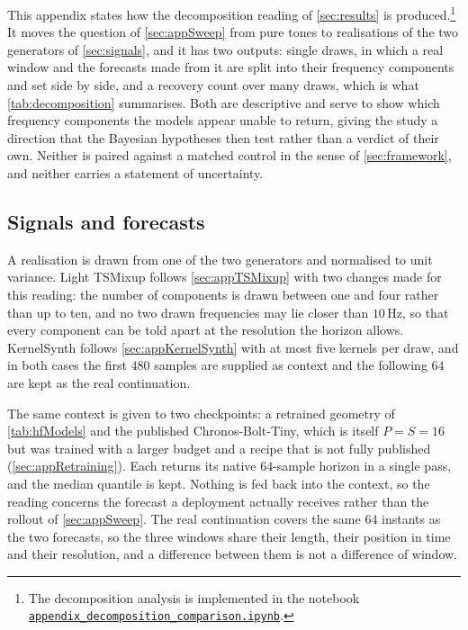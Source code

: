 This appendix states how the decomposition reading of \autoref{sec:results} is produced.\footnote{The decomposition analysis is implemented in the notebook \href{https://github.com/FedericoSabbadini/patchAliasing/blob/main/notebooks/signal_analysis/appendix_decomposition_comparison.ipynb}{\texttt{appendix\_decomposition\_comparison.ipynb}}.} It moves the question of \autoref{sec:appSweep} from pure tones to realisations of the two generators of \autoref{sec:signals}, and it has two outputs: single draws, in which a real window and the forecasts made from it are split into their frequency components and set side by side, and a recovery count over many draws, which is what \autoref{tab:decomposition} summarises. Both are descriptive and serve to show which frequency components the models appear unable to return, giving the study a direction that the Bayesian hypotheses then test rather than a verdict of their own. Neither is paired against a matched control in the sense of \autoref{sec:framework}, and neither carries a statement of uncertainty.

\subsection{Signals and forecasts}

A realisation is drawn from one of the two generators and normalised to unit variance. Light TSMixup follows \autoref{sec:appTSMixup} with two changes made for this reading: the number of components is drawn between one and four rather than up to ten, and no two drawn frequencies may lie closer than $10$\,Hz, so that every component can be told apart at the resolution the horizon allows. KernelSynth follows \autoref{sec:appKernelSynth} with at most five kernels per draw, and in both cases the first $480$ samples are supplied as context and the following $64$ are kept as the real continuation.

The same context is given to two checkpoints: a retrained geometry of \autoref{tab:hfModels} and the published Chronos-Bolt-Tiny, which is itself $P=S=16$ but was trained with a larger budget and a recipe that is not fully published (\autoref{sec:appRetraining}). Each returns its native $64$-sample horizon in a single pass, and the median quantile is kept. Nothing is fed back into the context, so the reading concerns the forecast a deployment actually receives rather than the rollout of \autoref{sec:appSweep}. The real continuation covers the same $64$ instants as the two forecasts, so the three windows share their length, their position in time and their resolution, and a difference between them is not a difference of window.

